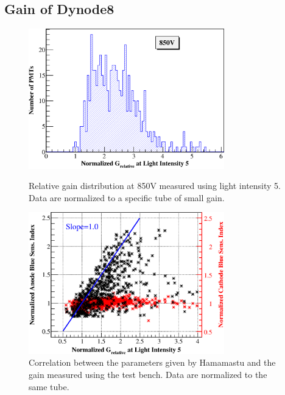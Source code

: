 \documentclass[review,number,sort&compress]{elsarticle}
\begin{document}
\subsection{Gain of Dynode8}
\label{sec:psd_gain}

\begin{figure}[h!]
 \centering
 \includegraphics[width=85mm]{GainDist}
\caption{Relative gain distribution at 850V measured using light intensity 5.
Data are normalized to a specific tube of small gain.}
\label{fig:gain_dist}
\vspace*{0.1in}
 \centering
 \includegraphics[width=85mm]{correlation_new}
\caption{Correlation between the parameters given by Hamamastu and the gain measured using the test bench.
Data are normalized to the same tube.}
\label{fig:gain_correlation}
\end{figure} 
\end{document}
